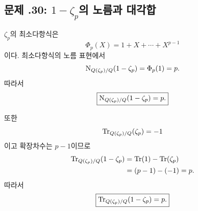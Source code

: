 \subsection*{문제 \thechapter.30: $1-\zeta_p$의 노름과 대각합}

\begin{solution}
$\zeta_p$의 최소다항식은
\[
  \Phi_p(X)=1+X+\cdots+X^{p-1}
\]
이다. 최소다항식의 노름 표현에서
\[
  \operatorname{N}_{Q(\zeta_p)/Q}(1-\zeta_p)
  =\Phi_p(1)=p.
\]
따라서
\[
  \boxed{
  \operatorname{N}_{Q(\zeta_p)/Q}(1-\zeta_p)=p.}
\]

또한
\[
  \operatorname{Tr}_{Q(\zeta_p)/Q}(\zeta_p)=-1
\]
이고 확장차수는 $p-1$이므로
\[
\begin{aligned}
  \operatorname{Tr}_{Q(\zeta_p)/Q}(1-\zeta_p)
  &=\operatorname{Tr}(1)-\operatorname{Tr}(\zeta_p)\\
  &=(p-1)-(-1)=p.
\end{aligned}
\]
따라서
\[
  \boxed{
  \operatorname{Tr}_{Q(\zeta_p)/Q}(1-\zeta_p)=p.}
\]
\end{solution}
